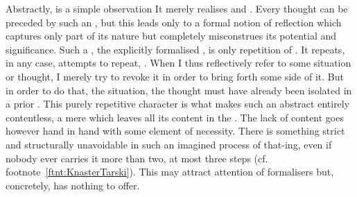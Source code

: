 \pa\label{pa:formalthat}
Abstractly,  is a simple observation   It
merely realises and .  Every thought can be preceded by such an
, but this leads only to a formal notion of reflection which
captures only part of its nature but completely misconstrues its potential and
significance. Such a , the explicitly formalised , is 
only repetition of . It repeats, in any case,
attempts to repeat, . When I thus reflectively refer to some
situation or thought, I merely try to revoke it in order to bring forth some
side of it. But in order to do that, the situation, the thought must have
already been isolated in a prior . This purely repetitive
character is what makes such an abstract  entirely contentless, a
mere  which leaves all its content in the .
%
The lack of content goes however hand in hand with some element of necessity. There
is something strict and structurally unavoidable in such an imagined
process of that-ing, even if nobody ever carries it more than two, at most three
steps (cf. footnote~{\small{\ref{ftnt:KnasterTarski}}}). This may attract attention of
formalisers but, concretely, has nothing to offer. 

